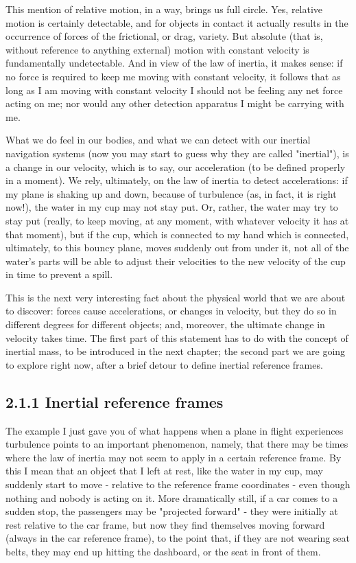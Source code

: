 \documentclass[10pt]{article}
\begin{document}
This mention of relative motion, in a way, brings us full circle. Yes, relative motion is certainly detectable, and for objects in contact it actually results in the occurrence of forces of the frictional, or drag, variety. But absolute (that is, without reference to anything external) motion with constant velocity is fundamentally undetectable. And in view of the law of inertia, it makes sense: if no force is required to keep me moving with constant velocity, it follows that as long as I am moving with constant velocity I should not be feeling any net force acting on me; nor would any other detection apparatus I might be carrying with me.

What we do feel in our bodies, and what we can detect with our inertial navigation systems (now you may start to guess why they are called "inertial"), is a change in our velocity, which is to say, our acceleration (to be defined properly in a moment). We rely, ultimately, on the law of inertia to detect accelerations: if my plane is shaking up and down, because of turbulence (as, in fact, it is right now!), the water in my cup may not stay put. Or, rather, the water may try to stay put (really, to keep moving, at any moment, with whatever velocity it has at that moment), but if the cup, which is connected to my hand which is connected, ultimately, to this bouncy plane, moves suddenly out from under it, not all of the water's parts will be able to adjust their velocities to the new velocity of the cup in time to prevent a spill.

This is the next very interesting fact about the physical world that we are about to discover: forces cause accelerations, or changes in velocity, but they do so in different degrees for different objects; and, moreover, the ultimate change in velocity takes time. The first part of this statement has to do with the concept of inertial mass, to be introduced in the next chapter; the second part we are going to explore right now, after a brief detour to define inertial reference frames.

\subsection*{2.1.1 Inertial reference frames}
The example I just gave you of what happens when a plane in flight experiences turbulence points to an important phenomenon, namely, that there may be times where the law of inertia may not seem to apply in a certain reference frame. By this I mean that an object that I left at rest, like the water in my cup, may suddenly start to move - relative to the reference frame coordinates - even though nothing and nobody is acting on it. More dramatically still, if a car comes to a sudden stop, the passengers may be "projected forward" - they were initially at rest relative to the car frame, but now they find themselves moving forward (always in the car reference frame), to the point that, if they are not wearing seat belts, they may end up hitting the dashboard, or the seat in front of them.
\end{document}
